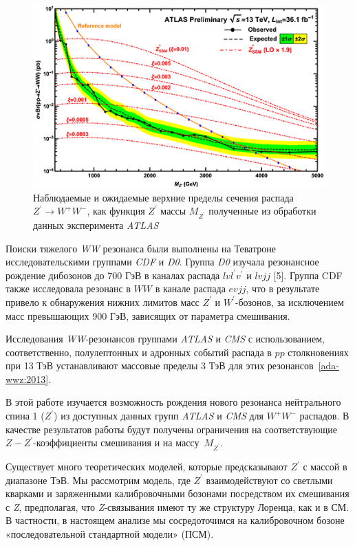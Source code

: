 \begin{figure}[!h]
	\centering
	\includegraphics[width=\textwidth]{figures/graph-1-verify.png}
	\caption{Наблюдаемые и ожидаемые верхние пределы сечения распада ${Z}^{\prime} \rightarrow {W}^{+}{W}^{-} $, как функция ${Z}^{\prime}$ массы ${M}_{{Z}^{\prime}}$ полученные из обработки данных эксперимента \textit{ATLAS}~\cite{2part-pankov}}
	\label{fig:graph-1-verify}
\end{figure}

Поиски тяжелого \textit{WW} резонанса были выполнены на Теватроне исследовательскими группами \textit{CDF} и \textit{D0}. Группа \textit{D0} изучала резонансное рождение дибозонов до 700 ГэВ в каналах распада $lvl^\prime v^\prime$ и $lvjj$ [5]. Группа CDF также исследовала резонанс в $WW$ в канале распада $evjj$, что в результате привело к обнаружения нижних лимитов масс $Z^\prime$
и $W^\prime$-бозонов, за исключением масс превышающих 900 ГэВ, зависящих от параметра смешивания.

Исследования \textit{WW}-резонансов группами \textit{ATLAS} и \textit{CMS} с использованием, соответственно, полулептонных и адронных событий распада в $pp$ столкновениях при 13 ТэВ устанавливают массовые пределы 3 ТэВ для этих резонансов~\ref{ada-wwz:2013}. 

В этой работе изучается возможность рождения нового резонанса нейтрального спина 1 ($Z^\prime$) из доступных данных групп \textit{ATLAS} и \textit{CMS} для $W^+W^-$ распадов. В качестве результатов работы будут получены ограничения на соответствующие $Z-Z^\prime$-коэффициенты смешивания и на массу~$M_{Z^\prime}$.

Существует много теоретических моделей, которые предсказывают $Z^\prime$ с массой в диапазоне ТэВ. Мы рассмотрим модель, где $Z^\prime$ взаимодействуют со светлыми кварками и заряженными калибровочными бозонами посредством их смешивания с \textit{Z}, предполагая, что \textit{Z}-связывания имеют ту же структуру Лоренца, как и в СМ. В частности, в настоящем анализе мы сосредоточимся на калибровочном бозоне «последовательной стандартной модели» (ПСМ).

